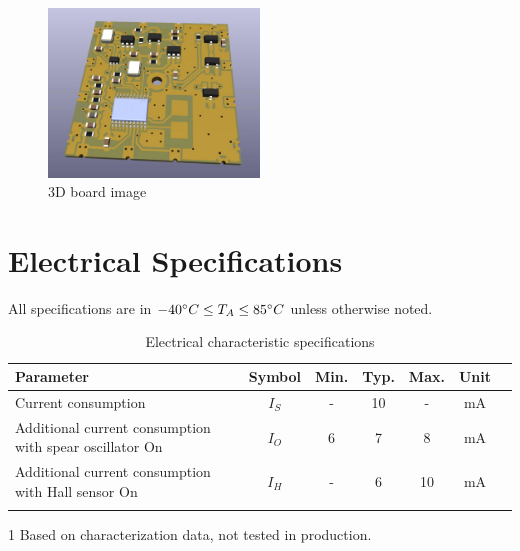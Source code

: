 \documentclass[10pt]{datasheet}
\begin{document}
\vfill\break

\begin{figure}[h]
    
	\centering
	\includegraphics[width=0.5\textwidth]{3d_render}
	\caption{3D board image}
\end{figure}


\onecolumn


\section{Electrical Specifications}
All specifications are in $-40\degree C \leq T_A \leq 85\degree C$ unless otherwise noted.

\begin{table}[h]
\begin{threeparttable}
	\caption{Electrical characteristic specifications}
\begin{tabularx}{\textwidth}{l | c | c c c | c | X}
    \thickhline
    \textbf{Parameter} & \textbf{Symbol} & \textbf{Min.} & \textbf{Typ.} & \textbf{Max.} &
    \textbf{Unit} \\
    \hline
    Current consumption  & $I_S$ & - & 10 & - & mA  \\
	Additional current consumption with spear oscillator On & $I_O$ & 6 & 7 & 8 & mA \\
	Additional current consumption with Hall sensor On & $I_H$ & - & 6 & 10 & mA \\
    \thickhline
\end{tabularx}
\begin{tablenotes}
\item[1]{Based on characterization data, not tested in production.}
\end{tablenotes}
\end{threeparttable}
\end{table}
\end{document}
